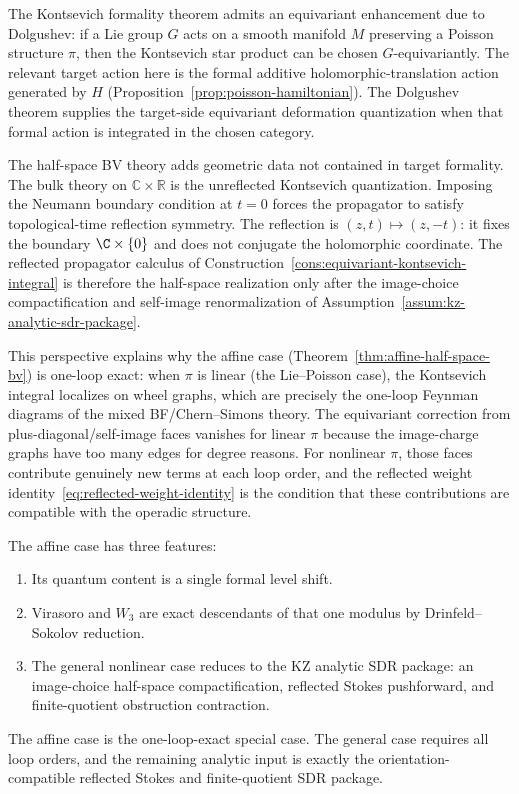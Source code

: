 \begin{remark}%
\label{rem:dolgushev-equivariant}
The Kontsevich formality theorem admits an equivariant enhancement due to
Dolgushev: if a Lie group $G$ acts on a smooth manifold $M$ preserving a
Poisson structure $\pi$, then the Kontsevich star product can be chosen
$G$-equivariantly. The relevant target action here is the formal additive
holomorphic-translation action generated by $H$
(Proposition~\ref{prop:poisson-hamiltonian}). The Dolgushev theorem supplies
the target-side equivariant deformation quantization when that formal action is
integrated in the chosen category.

The half-space BV theory adds geometric data not contained in target formality.
The bulk theory on $\mathbb C\times\mathbb R$ is the unreflected Kontsevich
quantization. Imposing the Neumann boundary condition at $t=0$ forces the
propagator to satisfy topological-time reflection symmetry. The reflection is
$(z,t)\mapsto(z,-t)$: it fixes the boundary $\C\times\{0\}$ and does
not conjugate the holomorphic coordinate. The reflected propagator calculus of
Construction~\ref{cons:equivariant-kontsevich-integral} is therefore the
half-space realization only after the image-choice compactification and
self-image renormalization of Assumption~\ref{assum:kz-analytic-sdr-package}.

This perspective explains why the affine case
(Theorem~\ref{thm:affine-half-space-bv})
is one-loop exact: when $\pi$ is linear (the Lie--Poisson case), the Kontsevich
integral localizes on wheel graphs, which are precisely the one-loop Feynman
diagrams of the mixed BF/Chern--Simons theory. The equivariant correction
from plus-diagonal/self-image faces vanishes for linear $\pi$ because
the image-charge graphs have too many edges for degree reasons. For
nonlinear $\pi$, those faces contribute genuinely new terms at each
loop order, and the reflected weight
identity~\eqref{eq:reflected-weight-identity} is the condition that
these contributions are compatible with the operadic structure.
\end{remark}

\begin{remark}
The affine case has three features:
\begin{enumerate}
 \item Its quantum content is a single formal level shift.
 \item Virasoro and $W_3$ are exact descendants of that one modulus
 by Drinfeld--Sokolov reduction.
 \item The general nonlinear case reduces to the KZ analytic SDR
 package: an image-choice half-space compactification, reflected
 Stokes pushforward, and finite-quotient obstruction contraction.
\end{enumerate}
The affine case is the one-loop-exact special case. The general
case requires all loop orders, and the remaining analytic input is exactly the
orientation-compatible reflected Stokes and finite-quotient SDR package.
\end{remark}

